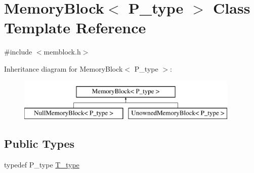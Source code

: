 \hypertarget{classMemoryBlock}{}\section{Memory\+Block$<$ P\+\_\+type $>$ Class Template Reference}
\label{classMemoryBlock}


{\ttfamily \#include $<$memblock.\+h$>$}

Inheritance diagram for Memory\+Block$<$ P\+\_\+type $>$\+:\begin{figure}[H]
\begin{center}
\leavevmode
\includegraphics[height=2.000000cm]{classMemoryBlock}
\end{center}
\end{figure}
\subsection*{Public Types}
\begin{DoxyCompactItemize}
\item 
typedef P\+\_\+type \hyperlink{classMemoryBlock_a6281668c80ac278a3912d82549b69d25}{T\+\_\+type}
\end{DoxyCompactItemize}
